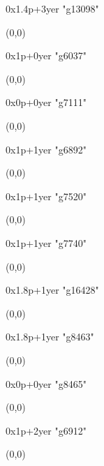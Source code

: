    0x1.4p+3yer "g13098"
  \begin{textblock}{1}(0,0)
  \end{textblock}

   0x1p+0yer "g6037"
  \begin{textblock}{1}(0,0)
  \end{textblock}

   0x0p+0yer "g7111"
  \begin{textblock}{1}(0,0)
  \end{textblock}

   0x1p+1yer "g6892"
  \begin{textblock}{1}(0,0)
  \end{textblock}

   0x1p+1yer "g7520"
  \begin{textblock}{1}(0,0)
  \end{textblock}

   0x1p+1yer "g7740"
  \begin{textblock}{1}(0,0)
  \end{textblock}

   0x1.8p+1yer "g16428"
  \begin{textblock}{1}(0,0)
  \end{textblock}

   0x1.8p+1yer "g8463"
  \begin{textblock}{1}(0,0)
  \end{textblock}

   0x0p+0yer "g8465"
  \begin{textblock}{1}(0,0)
  \end{textblock}

   0x1p+2yer "g6912"
  \begin{textblock}{1}(0,0)
  \end{textblock}

